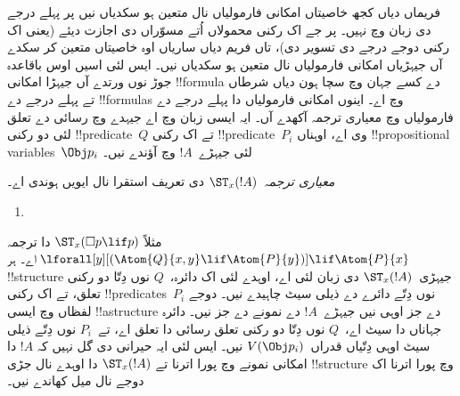 \documentclass[../../../include/open-logic-section]{subfiles}
\begin{document}


فریماں دیاں کجھ خاصیتاں امکانی فارمولیاں نال متعین ہو سکدیاں نیں پر پہلے درجے دی زبان وچ نہیں۔ پر جے اک رکنی محمولاں اُتے مسوّراں دی اجازت دیئے (یعنی اک رکنی دوجے درجے دی تسویر دی)، تاں فریم دیاں ساریاں اوہ خاصیتاں متعین کر سکدے آں جیہڑیاں امکانی فارمولیاں نال متعین ہو سکدیاں نیں۔ ایس لئی اسیں اوس باقاعدہ جوڑ نوں ورتدے آں جیہڑا امکانی !!{formula} دے کسے جہان وچ سچا ہون دیاں شرطاں تے پہلے درجے دے !!{formula}s وچ اے۔ اینوں امکانی فارمولیاں دا پہلے درجے دے فارمولیاں وچ معیاری ترجمہ آکھدے آں۔ ایہ ایسی زبان وچ اے جیہدے وچ رسائی دے تعلق لئی دو رکنی !!{predicate}~$Q$ تے اک رکنی !!{predicate}~$P_i$ وی اے، اوہناں !!{propositional variable}s~$\Obj p_i$ لئی جیہڑے~$!A$ وچ آؤندے نیں۔

\begin{defn}
  \emph{معیاری ترجمہ}~$\ST_x(!A)$ دی تعریف استقرا نال ایویں ہوندی اے۔
  \begin{enumerate}
  \item {}
  \end{enumerate}
\end{defn}

مثلاً $\ST_x(\Box p \lif p)$ دا ترجمہ $\lforall[y][(\Atom{Q}{x,y}
  \lif \Atom{P}{y})] \lif \Atom{P}{x}$ اے۔ ہر !!{structure} جیہڑی~$\ST_x(!A)$ دی زبان لئی اے، اوہدے لئی اک دائرہ،~$Q$ نوں دِتّا دو رکنی تعلق، تے اک رکنی !!{predicate}s~$P_i$ نوں دِتّے دائرے دے ذیلی سیٹ چاہیدے نیں۔ دوجے لفظاں وچ ایسی !!a{structure} دے جز اوہی نیں جیہڑے~$!A$ دے نمونے دے جز نیں۔ دائرہ جہاناں دا سیٹ اے،~$Q$ نوں دِتّا دو رکنی تعلق رسائی دا تعلق اے، تے~$P_i$ نوں دِتّے ذیلی سیٹ اوہی دِتّیاں قدراں~$V(\Obj p_i)$ نیں۔ ایس لئی ایہ حیرانی دی گل نہیں کہ $!A$ دا امکانی نمونے وچ پورا اترنا تے $\ST_x(!A)$ دا اوہدے نال جڑی !!{structure} وچ پورا اترنا اک دوجے نال میل کھاندے نیں۔
\end{document}
